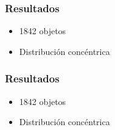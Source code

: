 \begin{frame}
    \frametitle{Resultados}
    \begin{itemize}
    \item 1842 objetos
    \item Distribución concéntrica
    \end{itemize}
    \endblock{}
		\begin{center}
		\end{center}
\end{frame}

\begin{frame}
    \frametitle{Resultados}
    \begin{itemize}
    \item 1842 objetos
    \item Distribución concéntrica
    \end{itemize}
    \endblock{}
		\begin{center}
		\end{center}
\end{frame}

